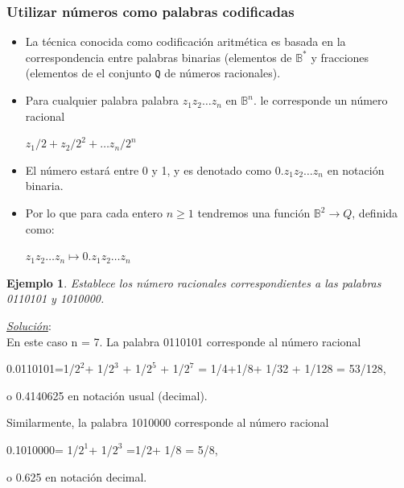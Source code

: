 \documentclass{beamer}
\theoremstyle{plain}
\theoremstyle{example}
\theoremstyle{example}
\newtheorem{ejemplo} [Ejemplo] {Ejemplo}
\begin{document}
\begin{frame} \frametitle{Utilizar números como palabras codificadas} \small 

\begin{itemize}
\item La técnica conocida como codificación aritmética es basada en la correspondencia entre palabras binarias (elementos de $\mathbb{B}^*$ y fracciones (elementos de el conjunto \texttt{Q} de números racionales).

\item Para cualquier palabra palabra $z_1 z_2 \ldots z_n$ en  $\mathbb{B}^n.$ le corresponde un número racional 

\begin{center}
$z_1/2 + z_2/2^2 + \ldots z_n/2^n$
\end{center}


\item  El número estará entre 0 y 1, y es denotado como $0.z_1z_2 \ldots z_n$ en notación binaria. 

\item  Por lo que para cada entero $n \geq 1$ tendremos una función $  \mathbb{B}^2 \rightarrow Q$, definida como:

\begin{center}
$z_1 z_2 \ldots z_n \mapsto 0.z_1z_2 \ldots z_n$
\end{center}
\end{itemize}

\end{frame} 

\begin{frame}  \small 

\begin{ejemplo}

Establece los número racionales correspondientes a las palabras 0110101 y 1010000.
\end{ejemplo}

\pause
\textit{\underline{Solución}}:\\
\vspace{0.5cm}
En este caso n = 7. La palabra 0110101 corresponde al número racional 

\begin{center}
0.0110101=1/$2^2$+ 1/$2^3$ + 1/$2^5$ + 1/$2^7$ = 1/4+1/8+ 1/32 + 1/128 = 53/128,
\end{center}

o 0.4140625 en notación usual (decimal).\\ 
\vspace{0.5cm}

Similarmente,  la palabra 1010000 corresponde al número racional 

\begin{center}
0.1010000= 1/$2^1$+ 1/$2^3$ =1/2+ 1/8 = 5/8,
\end{center}

o 0.625 en notación decimal. 



\end{frame} 
\end{document}
